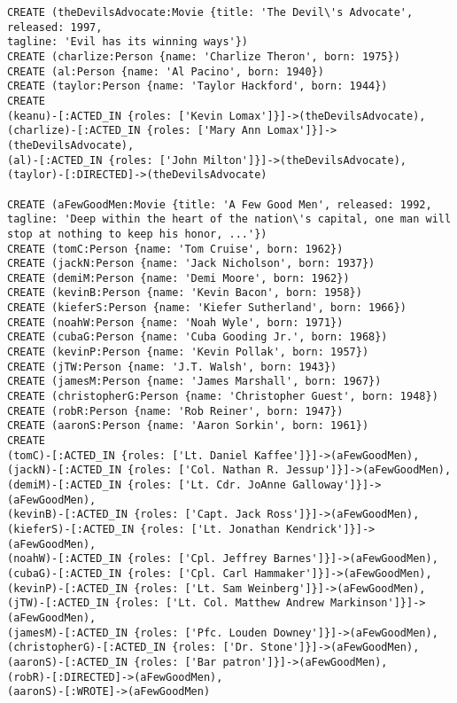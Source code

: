 \begin{lstlisting}
CREATE (theDevilsAdvocate:Movie {title: 'The Devil\'s Advocate', released: 1997,
tagline: 'Evil has its winning ways'})
CREATE (charlize:Person {name: 'Charlize Theron', born: 1975})
CREATE (al:Person {name: 'Al Pacino', born: 1940})
CREATE (taylor:Person {name: 'Taylor Hackford', born: 1944})
CREATE
(keanu)-[:ACTED_IN {roles: ['Kevin Lomax']}]->(theDevilsAdvocate),
(charlize)-[:ACTED_IN {roles: ['Mary Ann Lomax']}]->(theDevilsAdvocate),
(al)-[:ACTED_IN {roles: ['John Milton']}]->(theDevilsAdvocate),
(taylor)-[:DIRECTED]->(theDevilsAdvocate)

CREATE (aFewGoodMen:Movie {title: 'A Few Good Men', released: 1992,
tagline: 'Deep within the heart of the nation\'s capital, one man will stop at nothing to keep his honor, ...'})
CREATE (tomC:Person {name: 'Tom Cruise', born: 1962})
CREATE (jackN:Person {name: 'Jack Nicholson', born: 1937})
CREATE (demiM:Person {name: 'Demi Moore', born: 1962})
CREATE (kevinB:Person {name: 'Kevin Bacon', born: 1958})
CREATE (kieferS:Person {name: 'Kiefer Sutherland', born: 1966})
CREATE (noahW:Person {name: 'Noah Wyle', born: 1971})
CREATE (cubaG:Person {name: 'Cuba Gooding Jr.', born: 1968})
CREATE (kevinP:Person {name: 'Kevin Pollak', born: 1957})
CREATE (jTW:Person {name: 'J.T. Walsh', born: 1943})
CREATE (jamesM:Person {name: 'James Marshall', born: 1967})
CREATE (christopherG:Person {name: 'Christopher Guest', born: 1948})
CREATE (robR:Person {name: 'Rob Reiner', born: 1947})
CREATE (aaronS:Person {name: 'Aaron Sorkin', born: 1961})
CREATE
(tomC)-[:ACTED_IN {roles: ['Lt. Daniel Kaffee']}]->(aFewGoodMen),
(jackN)-[:ACTED_IN {roles: ['Col. Nathan R. Jessup']}]->(aFewGoodMen),
(demiM)-[:ACTED_IN {roles: ['Lt. Cdr. JoAnne Galloway']}]->(aFewGoodMen),
(kevinB)-[:ACTED_IN {roles: ['Capt. Jack Ross']}]->(aFewGoodMen),
(kieferS)-[:ACTED_IN {roles: ['Lt. Jonathan Kendrick']}]->(aFewGoodMen),
(noahW)-[:ACTED_IN {roles: ['Cpl. Jeffrey Barnes']}]->(aFewGoodMen),
(cubaG)-[:ACTED_IN {roles: ['Cpl. Carl Hammaker']}]->(aFewGoodMen),
(kevinP)-[:ACTED_IN {roles: ['Lt. Sam Weinberg']}]->(aFewGoodMen),
(jTW)-[:ACTED_IN {roles: ['Lt. Col. Matthew Andrew Markinson']}]->(aFewGoodMen),
(jamesM)-[:ACTED_IN {roles: ['Pfc. Louden Downey']}]->(aFewGoodMen),
(christopherG)-[:ACTED_IN {roles: ['Dr. Stone']}]->(aFewGoodMen),
(aaronS)-[:ACTED_IN {roles: ['Bar patron']}]->(aFewGoodMen),
(robR)-[:DIRECTED]->(aFewGoodMen),
(aaronS)-[:WROTE]->(aFewGoodMen)


\end{lstlisting}
